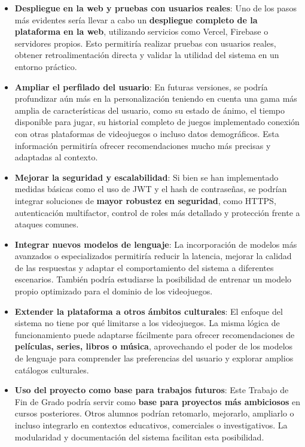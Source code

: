 \begin{itemize}
	
	\item \textbf{Despliegue en la web y pruebas con usuarios reales}:
	Uno de los pasos más evidentes sería llevar a cabo un \textbf{despliegue completo de la plataforma en la web}, utilizando servicios como Vercel, Firebase o servidores propios. Esto permitiría realizar pruebas con usuarios reales, obtener retroalimentación directa y validar la utilidad del sistema en un entorno práctico.
	
	\item \textbf{Ampliar el perfilado del usuario}:
	En futuras versiones, se podría profundizar aún más en la personalización teniendo en cuenta una gama más amplia de características del usuario, como su estado de ánimo, el tiempo disponible para jugar, su historial completo de juegos implementado conexión con otras plataformas de videojuegos o incluso datos demográficos. Esta información permitiría ofrecer recomendaciones mucho más precisas y adaptadas al contexto.
	
	\item \textbf{Mejorar la seguridad y escalabilidad}:
	Si bien se han implementado medidas básicas como el uso de JWT y el hash de contraseñas, se podrían integrar soluciones de \textbf{mayor robustez en seguridad}, como HTTPS, autenticación multifactor, control de roles más detallado y protección frente a ataques comunes. 
	
	\item \textbf{Integrar nuevos modelos de lenguaje}:
	La incorporación de modelos más avanzados o especializados permitiría reducir la latencia, mejorar la calidad de las respuestas y adaptar el comportamiento del sistema a diferentes escenarios. También podría estudiarse la posibilidad de entrenar un modelo propio optimizado para el dominio de los videojuegos.
	
	\item \textbf{Extender la plataforma a otros ámbitos culturales}:
	El enfoque del sistema no tiene por qué limitarse a los videojuegos. La misma lógica de funcionamiento puede adaptarse fácilmente para ofrecer recomendaciones de \textbf{películas, series, libros o música}, aprovechando el poder de los modelos de lenguaje para comprender las preferencias del usuario y explorar amplios catálogos culturales.
	
	\item \textbf{Uso del proyecto como base para trabajos futuros}:
	Este Trabajo de Fin de Grado podría servir como \textbf{base para proyectos más ambiciosos} en cursos posteriores. Otros alumnos podrían retomarlo, mejorarlo, ampliarlo o incluso integrarlo en contextos educativos, comerciales o investigativos. La modularidad y documentación del sistema facilitan esta posibilidad.
	

\end{itemize}
